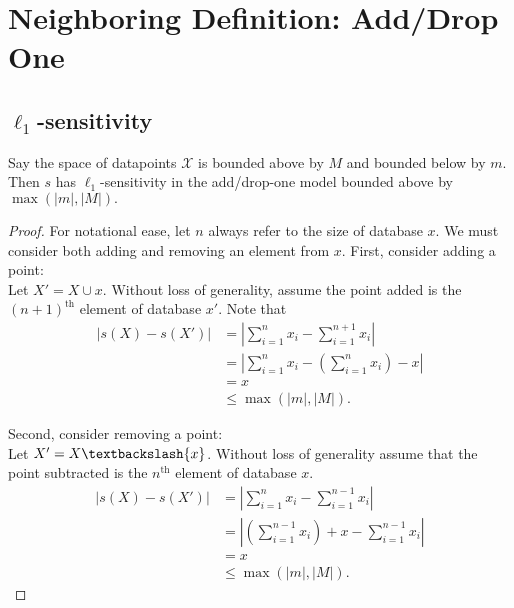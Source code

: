 \documentclass[11pt]{scrartcl} %
\begin{document}
\section{Neighboring Definition: Add/Drop One}
\subsection{$\ell_1$-sensitivity}

\begin{theorem}
Say the space of datapoints $\mathcal{X}$ is bounded above by $M$ and bounded below by $m$. Then $s$ has $\ell_1$-sensitivity in the add/drop-one model bounded above by $\max(\vert m \vert,\vert M \vert).$
\end{theorem}


\begin{proof}
For notational ease, let $n$ always refer to the size of database $x$. We must consider both adding and removing an element from $x$. First, consider adding a point:\\

Let $X' = X \cup {x}$. Without loss of generality, assume the point added is the $(n+1)^{\text{th}}$ element of database $x'$. Note that
\begin{align*}
\left \vert s(X) - s(X') \right\vert &= \left\vert \sum_{i=1}^n x_i - \sum_{i=1}^{n+1} x_i \right\vert \\
	&= \left\vert \sum_{i=1}^n x_i - \left(\sum_{i=1}^n x_i\right) - x \right\vert \\
	&= x \\
	&\le \max(\vert m \vert,\vert M \vert).
\end{align*}

Second, consider removing a point: \\
Let $X' = X\textbackslash\{x\}$. Without loss of generality assume that the point subtracted is the $n^{\text{th}}$ element of database $x$.
\begin{align*}
\left \vert s(X) - s(X') \right\vert &= \left\vert \sum_{i=1}^n x_i - \sum_{i=1}^{n-1} x_i \right\vert \\
	&= \left\vert \left(\sum_{i=1}^{n-1} x_i \right) + x - \sum_{i=1}^{n-1} x_i \right\vert \\
	&= x \\
	&\le \max(\vert m \vert,\vert M \vert).
\end{align*}
\end{proof}
\end{document}
